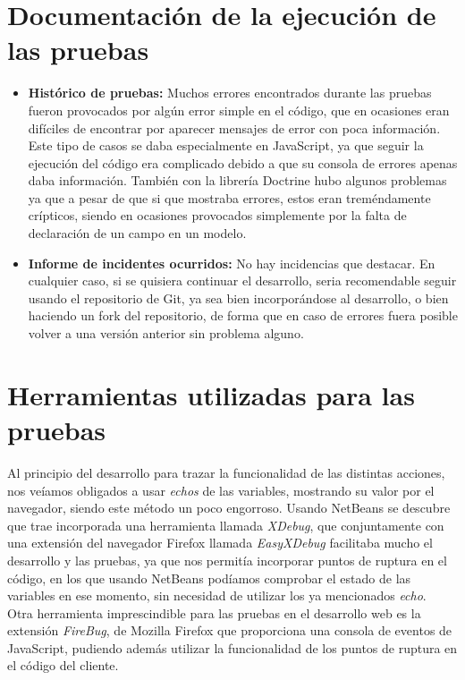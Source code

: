 \section{Documentación de la ejecución de las pruebas}
\begin{itemize}
\item {\bf Histórico de pruebas:} Muchos errores encontrados durante las pruebas fueron provocados por algún error simple en el código, que en ocasiones eran difíciles de encontrar por aparecer mensajes de error con poca información. Este tipo de casos se daba especialmente en JavaScript, ya que seguir la ejecución del código era complicado debido a que su consola de errores apenas daba información. También con la librería Doctrine hubo algunos problemas ya que a pesar de que si que mostraba errores, estos eran treméndamente crípticos, siendo en ocasiones provocados simplemente por la falta de declaración de un campo en un modelo.
\item {\bf Informe de incidentes ocurridos:} No hay incidencias que destacar. En cualquier caso, si se quisiera continuar el desarrollo, seria recomendable seguir usando el repositorio de Git, ya sea bien incorporándose al desarrollo, o bien haciendo un fork del repositorio, de forma que en caso de errores fuera posible volver a una versión anterior sin problema alguno.
\end{itemize}

\section{Herramientas utilizadas para las pruebas}

Al principio del desarrollo para trazar la funcionalidad de las distintas acciones, nos veíamos obligados a usar {\em echos} de las variables, mostrando su valor por el navegador, siendo este método un poco engorroso. Usando NetBeans se descubre que trae incorporada una herramienta llamada {\em XDebug}, que conjuntamente con una extensión del navegador Firefox llamada {\em EasyXDebug} facilitaba mucho el desarrollo y las pruebas, ya que nos permitía incorporar puntos de ruptura en el código, en los que usando NetBeans podíamos comprobar el estado de las variables en ese momento, sin necesidad de utilizar los ya mencionados {\em echo}.\\

Otra herramienta imprescindible para las pruebas en el desarrollo web es la extensión {\em FireBug}, de Mozilla Firefox que proporciona una consola de eventos de JavaScript, pudiendo además utilizar la funcionalidad de los puntos de ruptura en el código del cliente.

